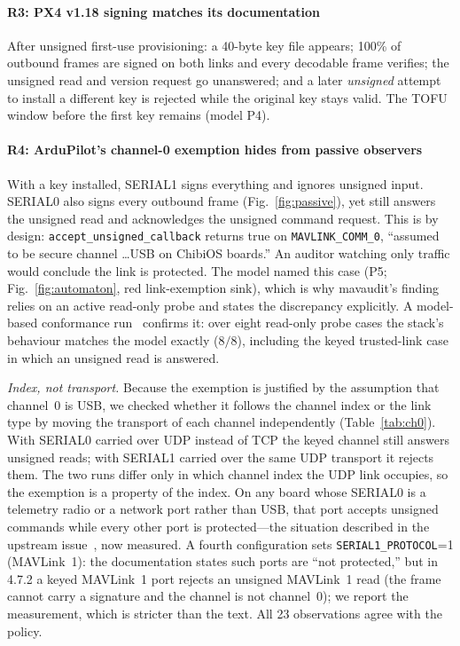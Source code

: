 \documentclass[conference]{IEEEtran}
\newcommand{\prop}[1]{\textsf{#1}}
\newcommand{\code}[1]{\texttt{#1}}
\begin{document}
\paragraph{\prop{R3}: PX4 v1.18 signing matches its documentation} After
unsigned first-use provisioning: a 40-byte key file appears; 100\% of outbound
frames are signed on both links and every decodable frame verifies; the unsigned
read and version request go unanswered; and a later \emph{unsigned} attempt to
install a different key is rejected while the original key stays valid. The TOFU
window before the first key remains (model \prop{P4}).

\paragraph{\prop{R4}: ArduPilot's channel-0 exemption hides from passive
observers} With a key installed, SERIAL1 signs everything and ignores unsigned
input. SERIAL0 also signs every outbound frame (Fig.~\ref{fig:passive}), yet
still answers the unsigned read and acknowledges the unsigned command request.
This is by design: \code{accept\_unsigned\_callback} returns true on
\code{MAVLINK\_COMM\_0}, ``assumed to be secure channel \ldots USB on ChibiOS
boards.'' An auditor watching only traffic would conclude the link is protected.
The model named this case (\prop{P5}; Fig.~\ref{fig:automaton}, red
link-exemption sink), which is why mavaudit's finding relies on an active
read-only probe and states the discrepancy explicitly. A model-based conformance
run~\cite{brighouse2026formal} confirms it: over eight read-only probe cases the
stack's behaviour matches the model exactly ($8/8$), including the keyed
trusted-link case in which an unsigned read is answered.

\emph{Index, not transport.} Because the exemption is justified by the
assumption that channel~0 is USB, we checked whether it follows the channel
index or the link type by moving the transport of each channel independently
(Table~\ref{tab:ch0}). With SERIAL0 carried over UDP instead of TCP the keyed
channel still answers unsigned reads; with SERIAL1 carried over the same UDP
transport it rejects them. The two runs differ only in which channel index the
UDP link occupies, so the exemption is a property of the index. On any board
whose SERIAL0 is a telemetry radio or a network port rather than USB, that port
accepts unsigned commands while every other port is protected---the situation
described in the upstream issue~\cite{ardupilot_issue34489}, now measured. A
fourth configuration sets \code{SERIAL1\_PROTOCOL}=1 (MAVLink~1): the
documentation states such ports are ``not protected,'' but in 4.7.2 a keyed
MAVLink~1 port rejects an unsigned MAVLink~1 read (the frame cannot carry a
signature and the channel is not channel~0); we report the measurement, which is
stricter than the text. All 23 observations agree with the policy.
\end{document}

